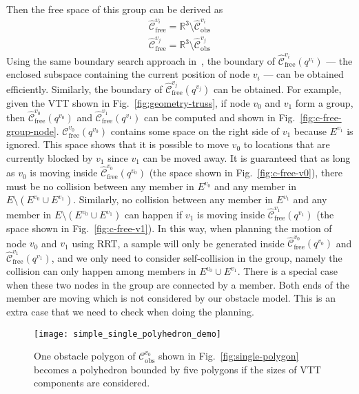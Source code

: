 \documentclass[journal]{IEEEtran}
\begin{document}
Then the free space of this group can be derived as
\begin{gather}
  \label{eq:free-space-group}
  \widehat{\mathcal{C}}_{\mathrm{free}}^{v_i} = \mathbb{R}^3\setminus
  \widehat{\mathcal{C}}_{\mathrm{obs}}^{v_i}\\
  \widehat{\mathcal{C}}_{\mathrm{free}}^{v_j} = \mathbb{R}^3\setminus
  \widehat{\mathcal{C}}_{\mathrm{obs}}^{v_j}
\end{gather}
Using the same boundary search approach
in~\cite{Liu-vtt-cspace-icra-2020}, the boundary of
$\widehat{\mathcal{C}}_{\mathrm{free}}^{v_i}(q^{v_i})$ --- the
enclosed subspace containing the current position of node $v_i$ ---
can be obtained efficiently. Similarly, the boundary of
$\widehat{\mathcal{C}}_{\mathrm{free}}^{v_j}(q^{v_j})$ can be
obtained. For example, given the VTT shown in
Fig.~\ref{fig:geometry-truss}, if node $v_0$ and $v_1$ form a group,
then $\widehat{\mathcal{C}}_{\mathrm{free}}^{v_0}(q^{v_0})$ and
$\widehat{\mathcal{C}}_{\mathrm{free}}^{v_1}(q^{v_1})$ can be computed
and shown in Fig.~\ref{fig:c-free-group-node}.
$\mathcal{C}_{\mathrm{free}}^{v_0}(q^{v_0})$ contains some space on
the right side of $v_1$ because $E^{v_1}$ is ignored. This space shows
that it is possible to move $v_0$ to locations that are currently
blocked by $v_1$ since $v_1$ can be moved away. It is guaranteed that
as long as $v_0$ is moving inside
$\widehat{\mathcal{C}}_{\mathrm{free}}^{v_0}(q^{v_0})$ (the space
shown in Fig.~\ref{fig:c-free-v0}), there must be no collision between
any member in $E^{v_0}$ and any member in
$E\setminus (E^{v_0}\cup E^{v_1})$. Similarly, no collision between
any member in $E^{v_1}$ and any member in
$E\setminus (E^{v_0}\cup E^{v_1})$ can happen if $v_1$ is moving
inside $\widehat{\mathcal{C}}_{\mathrm{free}}^{v_1}(q^{v_1})$ (the
space shown in Fig.~\ref{fig:c-free-v1}). In this way, when planning
the motion of node $v_0$ and $v_1$ using RRT, a sample will only be
generated inside
$\widehat{\mathcal{C}}_{\mathrm{free}}^{v_0}(q^{v_0})$ and
$\widehat{\mathcal{C}}_{\mathrm{free}}^{v_1}(q^{v_1})$, and we only
need to consider self-collision in the group, namely the collision can
only happen among members in $E^{v_0}\cup E^{v_1}$. There is a special
case when these two nodes in the group are connected by a member. Both
ends of the member are moving which is not considered by our obstacle
model. This is an extra case that we need to check when doing the
planning.

\begin{figure}[b]
  \centering
  \texttt{[image: simple\_single\_polyhedron\_demo]}
  \caption{One obstacle polygon of $\mathcal{C}_{\mathrm{obs}}^{v_0}$
    shown in Fig.~\ref{fig:single-polygon} becomes a polyhedron
    bounded by five polygons if the sizes of VTT components are
    considered.}
  \label{fig:exp-obs}
\end{figure}
\end{document}
